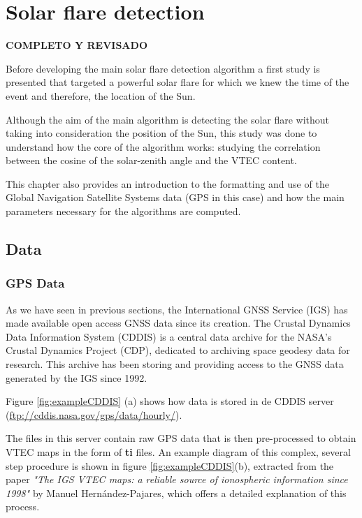 \chapter{Solar flare detection}

\textbf{COMPLETO Y REVISADO}

Before developing the main solar flare detection algorithm a first study is presented that targeted a powerful solar flare for which we knew the time of the event and therefore, the location of the Sun.

Although the aim of the main algorithm is detecting the solar flare without taking into consideration the position of the Sun, this study was done to understand how the core of the algorithm works: studying the correlation between the cosine of the solar-zenith angle and the VTEC content.

This chapter also provides an introduction to the formatting and use of the Global Navigation Satellite Systems data (GPS in this case) and how the main parameters necessary for the algorithms are computed.

\section{Data}

\subsection{GPS Data}

As we have seen in previous sections, the International GNSS Service (IGS) has made available open access GNSS data since its creation. The Crustal Dynamics Data Information System (CDDIS) is a central data archive for the NASA's Crustal Dynamics Project (CDP), dedicated to archiving space geodesy data for research. This archive has been storing and providing access to the GNSS data generated by the IGS since 1992.

Figure \ref{fig:exampleCDDIS} (a) shows how data is stored in de CDDIS server (\url{ftp://cddis.nasa.gov/gps/data/hourly/}).

The files in this server contain raw GPS data that is then pre-processed to obtain VTEC maps in the form of \textbf{ti} files. An example diagram of this complex, several step procedure is shown in figure \ref{fig:exampleCDDIS}(b), extracted from the paper \textit{"The IGS VTEC maps: a reliable source of ionospheric information since 1998"} \cite{hernandez2009igs} by Manuel Hernández-Pajares, which offers a detailed explanation of this process. 

